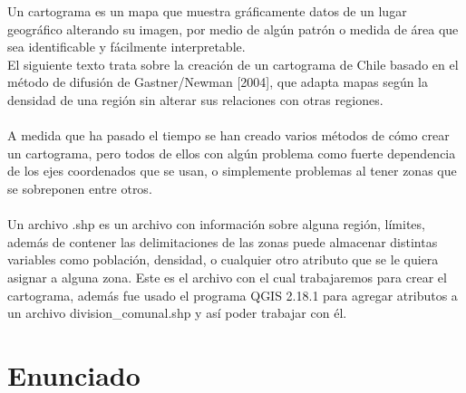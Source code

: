 \documentclass[20pt]{report}
\begin{document}
Un cartograma es un mapa que muestra gr\'aficamente datos de un lugar geogr\'afico alterando su  imagen,  por medio de alg\'un patr\'on o medida de \'area que sea identificable  y f\'acilmente interpretable.\\
 El siguiente texto trata sobre  la creaci\'on de un cartograma de Chile basado en el m\'etodo de difusi\'on de Gastner/Newman [2004], que adapta mapas seg\'un la densidad de una regi\'on sin alterar sus relaciones  con otras regiones.
 \\
 \\
A medida que ha pasado el tiempo se han creado varios m\'etodos de c\'omo crear un cartograma,  pero todos de ellos con alg\'un problema como fuerte dependencia de los ejes coordenados que se usan, o simplemente problemas al tener zonas que se sobreponen entre otros.
\\
\\
    
Un archivo .shp  es un archivo con informaci\'on sobre alguna regi\'on,  l\'imites, adem\'as de contener las delimitaciones de las zonas puede almacenar  distintas variables como poblaci\'on, densidad,  o cualquier otro atributo que se le quiera asignar a alguna zona. Este es el archivo con el cual  trabajaremos para crear el cartograma, adem\'as fue usado el programa QGIS 2.18.1 para agregar atributos a un archivo division\_comunal.shp y as\'i poder trabajar con \'el. 
\pagebreak



\chapter{Enunciado }\label{cap.introduccion}
\end{document}
